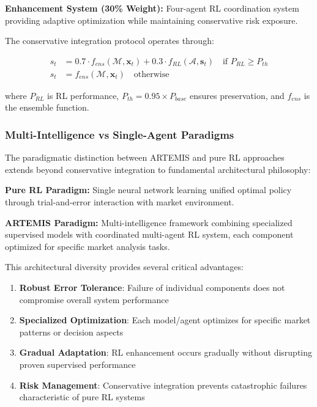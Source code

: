 \documentclass[10pt,twocolumn]{article}
\begin{document}
\textbf{Enhancement System (30\% Weight):} Four-agent RL coordination system providing adaptive optimization while maintaining conservative risk exposure.

The conservative integration protocol operates through:

\begin{align}
s_t &= 0.7 \cdot f_{ens}(\mathcal{M}, \mathbf{x}_t) + 0.3 \cdot f_{RL}(\mathcal{A}, \mathbf{s}_t) \quad \text{if } P_{RL} \geq P_{th} \\
s_t &= f_{ens}(\mathcal{M}, \mathbf{x}_t) \quad \text{otherwise}
\end{align}

\noindent where $P_{RL}$ is RL performance, $P_{th} = 0.95 \times P_{base}$ ensures preservation, and $f_{ens}$ is the ensemble function.

\subsubsection{Multi-Intelligence vs Single-Agent Paradigms}

The paradigmatic distinction between ARTEMIS and pure RL approaches extends beyond conservative integration to fundamental architectural philosophy:

\textbf{Pure RL Paradigm:} Single neural network learning unified optimal policy through trial-and-error interaction with market environment.

\textbf{ARTEMIS Paradigm:} Multi-intelligence framework combining specialized supervised models with coordinated multi-agent RL system, each component optimized for specific market analysis tasks.

This architectural diversity provides several critical advantages:

\begin{enumerate}[itemsep=1pt]
\item \textbf{Robust Error Tolerance}: Failure of individual components does not compromise overall system performance
\item \textbf{Specialized Optimization}: Each model/agent optimizes for specific market patterns or decision aspects
\item \textbf{Gradual Adaptation}: RL enhancement occurs gradually without disrupting proven supervised performance
\item \textbf{Risk Management}: Conservative integration prevents catastrophic failures characteristic of pure RL systems
\end{enumerate}
\end{document}
